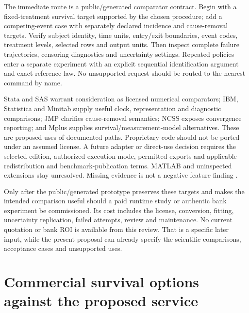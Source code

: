 The immediate route is a public/generated comparator contract. Begin with a
fixed-treatment survival target supported by the chosen procedure; add a
competing-event case with separately declared incidence and cause-removal
targets. Verify subject identity, time units, entry/exit boundaries, event
codes, treatment levels, selected rows and output units. Then inspect complete
failure trajectories, censoring diagnostics and uncertainty settings. Repeated
policies enter a separate experiment with an explicit sequential identification
argument and exact reference law. No unsupported request should be routed to
the nearest command by name.

Stata and SAS warrant consideration as licensed numerical comparators;
IBM, Statistica and Minitab supply useful clock, representation and diagnostic
comparisons; JMP clarifies cause-removal semantics; NCSS exposes convergence
reporting; and Mplus supplies survival/measurement-model alternatives.
These are proposed uses of documented paths. Proprietary code should not be
ported under an assumed license. A future adapter or direct-use decision
requires the selected edition, authorized execution mode, permitted exports
and applicable redistribution and benchmark-publication terms. MATLAB and
uninspected extensions stay unresolved. Missing evidence is not a negative
feature finding \citep{exec14_survival_survey}.

Only after the public/generated prototype preserves these targets and makes
the intended comparison useful should a paid runtime study or authentic bank
experiment be commissioned. Its cost includes the license, conversion,
fitting, uncertainty replication, failed attempts, review and maintenance.
No current quotation or bank ROI is available from this review. That is a
specific later input, while the present proposal can already specify the
scientific comparisons, acceptance cases and unsupported uses.
\label{exec15:commercial-survival-end}


\section{Commercial survival options against the proposed service}
\label{exec16:commercial-matrix}

